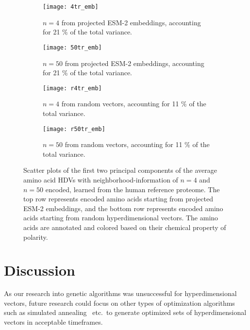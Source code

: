 \begin{figure}[H]
    \centering
    \begin{subfigure}[b]{0.45\textwidth}
        \texttt{[image: 4tr\_emb]}
        \caption{$n = 4$ from projected ESM-2 embeddings, accounting for 21 \% of the total variance.}
        \label{fig:AAtr4}
    \end{subfigure}
    \hfill
    \begin{subfigure}[b]{0.45\textwidth}
        \texttt{[image: 50tr\_emb]}
        \caption{$n = 50$ from projected ESM-2 embeddings, accounting for 21 \% of the total variance.}
        \label{fig:AAtr50}
    \end{subfigure}
    \vspace{10pt} %
    \begin{subfigure}[b]{0.45\textwidth}
        \texttt{[image: r4tr\_emb]}
        \caption{$n = 4$ from random vectors, accounting for 11 \% of the total variance.}
        \label{fig:AArtr4}
    \end{subfigure}
    \hfill
    \begin{subfigure}[b]{0.45\textwidth}
        \texttt{[image: r50tr\_emb]}
        \caption{$n = 50$ from random vectors, accounting for 11 \% of the total variance.}
        \label{fig:AArtr50}
    \end{subfigure}
    \caption{Scatter plots of the first two principal components of the average amino acid HDVs with neighborhood-information of $n = 4$ and $n = 50$ encoded, learned from the human reference proteome. The top row represents encoded amino acids starting from projected ESM-2 embeddings, and the bottom row represents encoded amino acids starting from random hyperdimensional vectors. The amino acids are annotated and colored based on their chemical property of polarity.}\label{fig:bigfig}
\end{figure}

\section{Discussion}\label{sec:dis3}
As our research into genetic algorithms was unsuccessful for hyperdimensional vectors, future research could focus on other types of optimization algorithms such as simulated annealing~\cite{sa} etc.\ to generate optimized sets of hyperdimensional vectors in acceptable timeframes.

